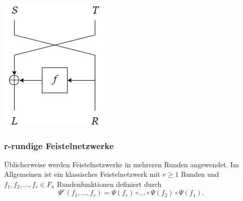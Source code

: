 \documentclass[course=erap]{aspdoc}
\begin{document}
\begin{center}
    \includegraphics[scale=0.5]{img/1_round_feistel_cipher_dec.png}
\end{center}

\subsubsection{r-rundige Feistelnetzwerke}

Üblicherweise werden Feistelnetzwerke in mehreren Runden angewendet. Im Allgemeinen ist ein klassisches Feistelnetzwerk mit $r \geq 1$ Runden und $f_1, f_2, ..., f_r \in F_n$ Rundenfunktionen definiert durch
\[
    \Psi^r(f_1, ..., f_r) = \Psi(f_r) \circ ... \circ \Psi(f_2) \circ \Psi(f_1).
\]\cite[p.12]{nachef}
\end{document}
